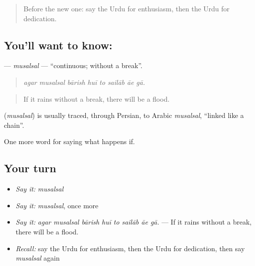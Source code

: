 \label{lesson:UR-C379-musalsal}



\begin{quote}
Before the new one: say the Urdu for enthusiasm, then the Urdu for dedication.
\end{quote}

\subsection*{You'll want to know: }
\textbf{} — \emph{musalsal} — \textquotedblleft{}continuous; without a break\textquotedblright{}.

\begin{quote}
       
\end{quote}

\begin{quote}
\emph{agar musalsal bārish huī to sailāb āe gā.}
\end{quote}

\begin{quote}
If it rains without a break, there will be a flood.
\end{quote}

\begin{cousinweb}
\textbf{} (\emph{musalsal}) is usually traced, through Persian, to Arabic \emph{musalsal}, \textquotedblleft{}linked like a chain\textquotedblright{}.
\end{cousinweb}

\begin{grammarlens}[title={What you've built}]
One more word for saying what happens if.
\end{grammarlens}

\subsection*{Your turn}
\begin{itemize}
\raggedright
  \item \emph{Say it:} \emph{musalsal}
  \item \emph{Say it:} \emph{musalsal}, once more
  \item \emph{Say it:} \emph{agar musalsal bārish huī to sailāb āe gā.} — If it rains without a break, there will be a flood.
  \item \emph{Recall:} say the Urdu for enthusiasm, then the Urdu for dedication, then say \emph{musalsal} again
\end{itemize}

